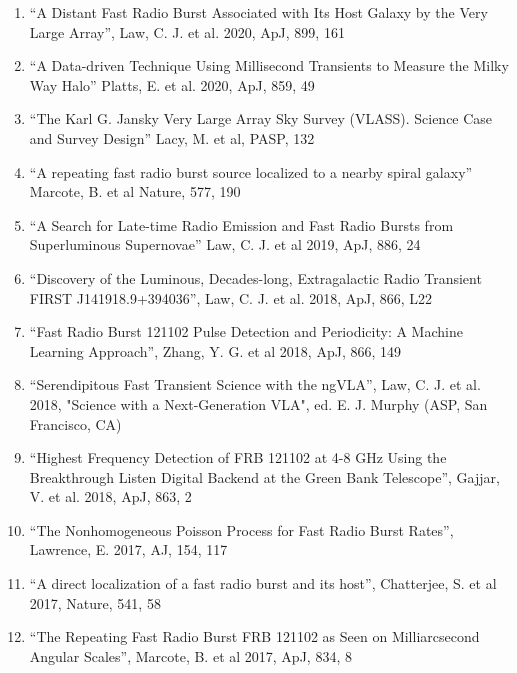\documentclass[11pt]{article}
\begin{document}
\begin{enumerate}
    \item ``A Distant Fast Radio Burst Associated with Its Host Galaxy by the Very Large Array'', Law, C. J. et al. 2020, ApJ, 899, 161

    \item ``A Data-driven Technique Using Millisecond Transients to Measure the Milky Way Halo'' Platts, E. et al. 2020, ApJ, 859, 49

    \item ``The Karl G. Jansky Very Large Array Sky Survey (VLASS). Science Case and Survey Design'' Lacy, M. et al, PASP, 132

    \item ``A repeating fast radio burst source localized to a nearby spiral galaxy'' Marcote, B. et al Nature, 577, 190

    \item ``A Search for Late-time Radio Emission and Fast Radio Bursts from Superluminous Supernovae'' Law, C. J. et al 2019, ApJ, 886, 24
  
    \item ``Discovery of the Luminous, Decades-long, Extragalactic Radio Transient FIRST J141918.9+394036'', Law, C. J. et al. 2018, ApJ, 866, L22

    \item ``Fast Radio Burst 121102 Pulse Detection and Periodicity: A Machine Learning Approach'', Zhang, Y. G. et al 2018, ApJ, 866, 149

    \item ``Serendipitous Fast Transient Science with the ngVLA'', Law, C. J. et al. 2018, "Science with a Next-Generation VLA", ed. E. J. Murphy (ASP, San Francisco, CA)

    \item ``Highest Frequency Detection of FRB 121102 at 4-8 GHz Using the Breakthrough Listen Digital Backend at the Green Bank Telescope'', Gajjar, V. et al. 2018, ApJ, 863, 2
    
    \item ``The Nonhomogeneous Poisson Process for Fast Radio Burst Rates'', Lawrence, E. 2017, AJ, 154, 117
    
    \item ``A direct localization of a fast radio burst and its host'', Chatterjee, S. et al 2017, Nature, 541, 58
    
    \item ``The Repeating Fast Radio Burst FRB 121102 as Seen on Milliarcsecond Angular Scales'', Marcote, B. et al 2017, ApJ, 834, 8


\end{enumerate}
\end{document}
